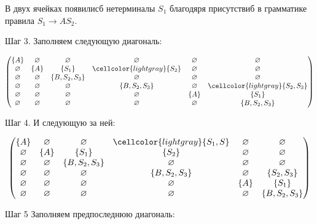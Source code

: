 \begin{example}
В двух ячейках появилисб нетерминалы $S_1$ благодяря присутствиб в грамматике правила $S_1 \to A S_2$.

Шаг 3. Заполняем следующую диагональ:

\[
\begin{pmatrix}
\{A\}       & \varnothing & \varnothing    & \varnothing      & \varnothing & \varnothing    \\
\varnothing & \{A\}       & \{S_1\}        & \cellcolor{lightgray}\{S_2\}          & \varnothing & \varnothing    \\
\varnothing & \varnothing & \{B, S_2, S_3\} & \varnothing     & \varnothing & \varnothing    \\
\varnothing & \varnothing & \varnothing    & \{B, S_2, S_3\}   & \varnothing & \cellcolor{lightgray}\{S_2, S_3\}  \\
\varnothing & \varnothing & \varnothing    & \varnothing      & \{A\}       & \{S_1\}            \\
\varnothing & \varnothing & \varnothing    & \varnothing      & \varnothing & \{B, S_2, S_3\} \\
\end{pmatrix}
\]

Шаг 4. И следующую за ней:

\[
\begin{pmatrix}
\{A\}       & \varnothing & \varnothing    & \cellcolor{lightgray}\{S_1, S\}       & \varnothing & \varnothing    \\
\varnothing & \{A\}       & \{S_1\}            & \{S_2\}          & \varnothing & \varnothing    \\
\varnothing & \varnothing & \{B, S_2, S_3\} & \varnothing     & \varnothing & \varnothing    \\
\varnothing & \varnothing & \varnothing    & \{B, S_2, S_3\}   & \varnothing & \{S_2, S_3\}  \\
\varnothing & \varnothing & \varnothing    & \varnothing      & \{A\}       & \{S_1\}            \\
\varnothing & \varnothing & \varnothing    & \varnothing      & \varnothing & \{B, S_2, S_3\} \\
\end{pmatrix}
\]

Шаг 5 Заполняем предпоследнюю диагональ:


\end{example}

